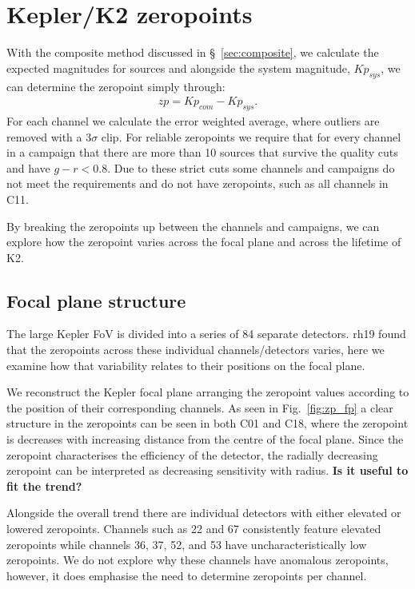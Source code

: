 \documentclass{aastex63}
\begin{document}
\section{Kepler/K2 zeropoints}
With the composite method discussed in \S~\ref{sec:composite}, we calculate the expected magnitudes for sources and alongside the system magnitude, $Kp_{sys}$, we can determine the zeropoint simply through:
\begin{eqnarray}
zp = Kp_{com} - Kp_{sys}.
\end{eqnarray}
For each channel we calculate the error weighted average, where outliers are removed with a $3\sigma$ clip. For reliable zeropoints we require that for every channel in a campaign that there are more than 10 sources that survive the quality cuts and have $g-r<0.8$. Due to these strict cuts some channels and campaigns do not meet the requirements and do not have zeropoints, such as all channels in C11.

By breaking the zeropoints up between the channels and campaigns, we can explore how the zeropoint varies across the focal plane and across the lifetime of K2. 

\subsection{Focal plane structure}
The large Kepler FoV is divided into a series of 84 separate detectors. rh19 found that the zeropoints across these individual channels/detectors varies, here we examine how that variability relates to their positions on the focal plane.

We reconstruct the Kepler focal plane arranging the zeropoint values according to the position of their corresponding channels. As seen in Fig.~\ref{fig:zp_fp} a clear structure in the zeropoints can be seen in both C01 and C18, where the zeropoint is decreases with increasing distance from the centre of the focal plane. Since the zeropoint characterises the efficiency of the detector, the radially decreasing  zeropoint can be interpreted as decreasing sensitivity with radius. \textbf{Is it useful to fit the trend?} 

Alongside the overall trend there are individual detectors with either elevated or lowered zeropoints. Channels such as 22 and 67 consistently feature elevated zeropoints while channels 36, 37, 52, and 53 have uncharacteristically low zeropoints. We do not explore why these channels have anomalous zeropoints, however, it does emphasise the need to determine zeropoints per channel. 
\end{document}
